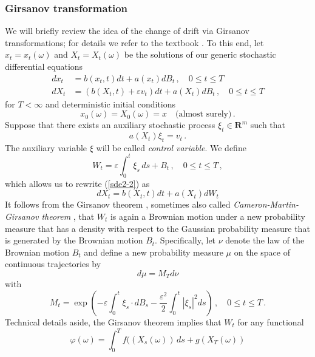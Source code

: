 \documentclass[]{tMPH2e}
\newcommand{\R}{{\mathbf R}}
\newcommand{\eps}{\varepsilon}
\newcommand{\wrt}{with respect to }
\begin{document}
\subsubsection*{Girsanov transformation}
We will briefly review the idea of the change of drift via Girsanov transformations; for details we refer to the textbook \cite{oksendal2003stochastic}. To this end, let $x_{t}=x_{t}(\omega)$ and $X_{t}=X_{t}(\omega)$ be the solutions of our generic stochastic differential equations
\begin{subequations}\label{sde2}
\begin{align}
dx_{t} & = b(x_{t},t)dt + a(x_{t})dB_{t}\,,\quad 0\le t\le T  \label{sde2-1}\\
dX_{t} & = (b(X_{t},t) + \eps v_{t})dt +a(X_{t})dB_{t}\,,\quad 0\le t\le T \label{sde2-2}
\end{align}
\end{subequations}
for $T<\infty$ and deterministic initial conditions
\[
x_{0}(\omega) = X_{0}(\omega) = x\quad\textrm{(almost surely)}\,.
\]
Suppose that there exists an auxiliary stochastic process $\xi_{t}\in\R^{m}$ such that 
\begin{equation}\label{xi}
a(X_{t})\xi_{t} = v_{t}\,.
\end{equation}
The auxiliary variable $\xi$ will be called \emph{control variable}. We define  
\[
W_{t} = \eps\int_{0}^{t}\xi_{s}\,ds + B_{t}\,,\quad 0\le t\le T\,,
\]
which allows us to rewrite (\ref{sde2-2}) as
\begin{equation}\label{sde2-3}
dX_{t} = b(X_{t},t)dt +a(X_{t})dW_{t} 
\end{equation}
It follows from the Girsanov theorem \cite[Thm.~8.6.8]{oksendal2003stochastic}, sometimes also called \emph{Cameron-Martin-Girsanov theorem} \cite{stroock2006}, that $W_{t}$ is again a Brownian motion under a new probability measure that has a density \wrt the Gaussian probability measure that is generated by the Brownian motion $B_{t}$. Specifically, let $\nu$ denote the law of the Brownian motion $B_{t}$ and define a new probability measure $\mu$ on the space of continuous trajectories by 
\[
d\mu=M_{T}d\nu
\]
with 
\begin{equation}\label{likelihood}
M_{t} = \exp\left(-\eps\int_{0}^{t}\xi_{s}\cdot dB_{s} - \frac{\eps^{2}}{2}\int_{0}^{t}|\xi_{s}|^{2}ds\right)\,,\quad 0\le t\le T\,.
\end{equation}
Technical details aside, the Girsanov theorem implies that $W_{t}$  for any functional 
\[
\varphi(\omega)=\int_{0}^{T}f((X_{s}(\omega))\,ds + g(X_{T}(\omega))
\] 
\end{document}
